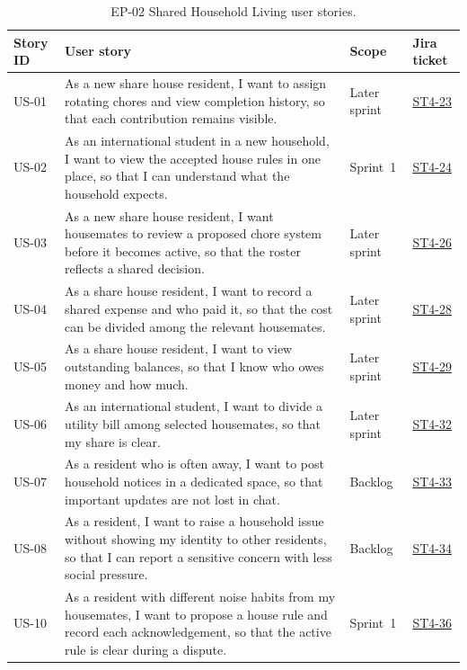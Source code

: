 \documentclass[11pt,a4paper]{article}
\begin{document}
\begin{table}[H]
    \centering
    \small
    \caption{EP-02 Shared Household Living user stories.}
    \begin{tabularx}{\textwidth}{@{}L{1.4cm}Y L{1.8cm}L{2.2cm}@{}}
        \toprule
        Story ID & User story & Scope & Jira ticket\\
        \midrule
        US-01 & As a new share house resident, I want to assign rotating chores and view completion history, so that each contribution remains visible. & Later sprint & \href{https://unsw-team-desn-seng2026.atlassian.net/browse/ST4-23}{ST4-23}\\
        US-02 & As an international student in a new household, I want to view the accepted house rules in one place, so that I can understand what the household expects. & Sprint~1 & \href{https://unsw-team-desn-seng2026.atlassian.net/browse/ST4-24}{ST4-24}\\
        US-03 & As a new share house resident, I want housemates to review a proposed chore system before it becomes active, so that the roster reflects a shared decision. & Later sprint & \href{https://unsw-team-desn-seng2026.atlassian.net/browse/ST4-26}{ST4-26}\\
        US-04 & As a share house resident, I want to record a shared expense and who paid it, so that the cost can be divided among the relevant housemates. & Later sprint & \href{https://unsw-team-desn-seng2026.atlassian.net/browse/ST4-28}{ST4-28}\\
        US-05 & As a share house resident, I want to view outstanding balances, so that I know who owes money and how much. & Later sprint & \href{https://unsw-team-desn-seng2026.atlassian.net/browse/ST4-29}{ST4-29}\\
        US-06 & As an international student, I want to divide a utility bill among selected housemates, so that my share is clear. & Later sprint & \href{https://unsw-team-desn-seng2026.atlassian.net/browse/ST4-32}{ST4-32}\\
        US-07 & As a resident who is often away, I want to post household notices in a dedicated space, so that important updates are not lost in chat. & Backlog & \href{https://unsw-team-desn-seng2026.atlassian.net/browse/ST4-33}{ST4-33}\\
        US-08 & As a resident, I want to raise a household issue without showing my identity to other residents, so that I can report a sensitive concern with less social pressure. & Backlog & \href{https://unsw-team-desn-seng2026.atlassian.net/browse/ST4-34}{ST4-34}\\
        US-10 & As a resident with different noise habits from my housemates, I want to propose a house rule and record each acknowledgement, so that the active rule is clear during a dispute. & Sprint~1 & \href{https://unsw-team-desn-seng2026.atlassian.net/browse/ST4-36}{ST4-36}\\
        \bottomrule
    \end{tabularx}
    \label{tabstoriesep02}
\end{table}
\end{document}
